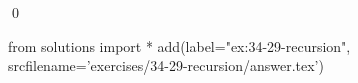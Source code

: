 
\begin{ex}
  \label{ex:34-29-recursion}
  
  \qed
\end{ex}
\begin{python0}
from solutions import *
add(label="ex:34-29-recursion",
    srcfilename='exercises/34-29-recursion/answer.tex')
\end{python0}
